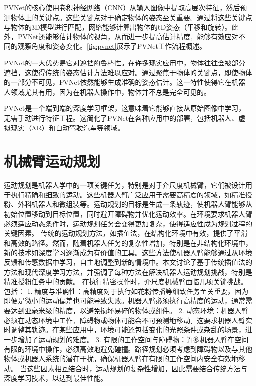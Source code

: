 PVNet的核心使用卷积神经网络（CNN）从输入图像中提取高层次特征，然后预测物体上的关键点。这些关键点对于确定物体的姿态至关重要。通过将这些关键点与物体的3D模型进行匹配，网络能够计算出物体的6D姿态（平移和旋转）。此外，PVNet还能够估计物体的视角，从而进一步提高估计精度，能够有效应对不同的观察角度和姿态变化。\cref{fig:pvnet}展示了PVNet工作流程概述。

PVNet的一大优势是它对遮挡的鲁棒性。在许多现实应用中，物体往往会被部分遮挡，这使得传统的姿态估计方法难以应对。通过聚焦于物体的关键点，即使物体的一部分不可见，PVNet依然能够生成准确的姿态估计。这一特性使得它在机器人领域尤其有用，因为在机器人操作中，物体并不总是完全可见的。

PVNet是一个端到端的深度学习框架，这意味着它能够直接从原始图像中学习，无需手动进行特征工程。这简化了PVNet在各种应用中的部署，包括机器人、虚拟现实（AR）和自动驾驶汽车等领域。


\section{机械臂运动规划}
运动规划是机器人学中的一项关键任务，特别是对于介尺度机械臂，它们被设计用于执行精确和细致的运动。这些机器人臂广泛应用于需要高精度的领域，如精准授粉、外科机器人和微组装等。运动规划的目标是生成一条轨迹，使机器人臂能够从初始位置移动到目标位置，同时避开障碍物并优化运动效率。在环境要求机器人臂必须适应动态条件时，运动规划任务会变得更加复杂，使得适应性成为规划过程的关键因素。
传统的运动规划方法，如插值法，在结构化环境中有效，提供了平滑和高效的路径。然而，随着机器人任务的复杂性增加，特别是在非结构化环境中，新的技术如深度学习逐渐成为有价值的工具。这些方法使机器人臂能够通过从环境反馈和传感数据中学习，自主地调整到新的情境中。本文讨论了基于传统插值法的方法和现代深度学习方法，并强调了每种方法在解决机器人运动规划挑战，特别是精准授粉任务中的贡献。
在执行精密操作时，介尺度机械臂面临几项关键挑战。包括：
1.	精度与准确性：高精度对于执行如花粉传播等细致任务至关重要，因为即便是微小的运动偏差也可能导致失败。机器人臂必须执行高精度的运动，通常需要达到亚毫米级的精度，以避免损坏易碎的物体或组件。
2.	动态环境：机器人臂必须在动态环境中工作，障碍物或物体可能会不可预测地移动，这要求机器人臂实时调整其轨迹。在某些应用中，环境可能还包括变化的光照条件或杂乱的场景，进一步增加了运动规划的难度。
3.	有限的工作空间与障碍物：许多机器人臂在空间有限的环境中操作，必须高效地避免碰撞。路径规划必须考虑到障碍物以及与其他物体或机器人系统的潜在干扰，确保机器人臂在有限的工作空间内安全有效地移动。
当这些因素相互结合时，运动规划的复杂性增加，因此需要结合传统方法与深度学习技术，以达到最佳性能。



